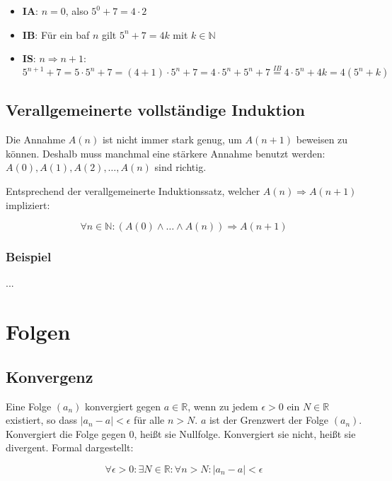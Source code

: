 \documentclass[10pt,a4paper,twoside,twocolumn]{article}
\begin{document}
	\begin{itemize}
		\setlength\itemsep{0em}
		\item \textbf{IA}: $ n = 0 $, also $ 5^0 + 7 = 4 \cdot 2 $
		\item \textbf{IB}: Für ein baf $ n $ gilt $ 5^n + 7 = 4k $ mit $ k \in \mathbb{N} $
		\item \textbf{IS}: $ n \Rightarrow n + 1 $: $ 5^{n + 1} + 7 = 5 \cdot 5^n + 7 = (4 + 1) \cdot 5^n + 7 = 4 \cdot 5^n + 5^n + 7 \stackrel{IB}{=} 4 \cdot 5^n + 4k = 4(5^n + k) $
	\end{itemize}
	
	\subsection{Verallgemeinerte vollständige Induktion}
	
	Die Annahme $ A(n) $ ist nicht immer stark genug, um $ A(n + 1) $ beweisen zu können. Deshalb muss manchmal eine stärkere Annahme benutzt werden: $ A(0), A(1), A(2), \ldots, A(n) $ sind richtig.
	
	Entsprechend der verallgemeinerte Induktionssatz, welcher $ A(n) \Rightarrow A(n + 1) $ impliziert:
	
	\[ \forall n \in \mathbb{N}: (A(0) \land \ldots \land A(n)) \Rightarrow A(n + 1) \]
	
	\subsubsection{Beispiel}
	
	...
	
	\section{Folgen}
	
	\subsection{Konvergenz}
	
	Eine Folge $ (a_n) $ konvergiert gegen $ a \in \mathbb{R} $, wenn zu jedem $ \epsilon > 0 $ ein $ N \in \mathbb{R} $ existiert, so dass $ | a_n - a | < \epsilon $ für alle $ n > N $. $ a $ ist der Grenzwert der Folge $ (a_n) $. Konvergiert die Folge gegen 0, heißt sie Nullfolge. Konvergiert sie nicht, heißt sie divergent. Formal dargestellt:
	
	\[ \forall \epsilon > 0 : \exists N \in \mathbb{R} : \forall n > N : |a_n - a| < \epsilon \]
	
\end{document}
